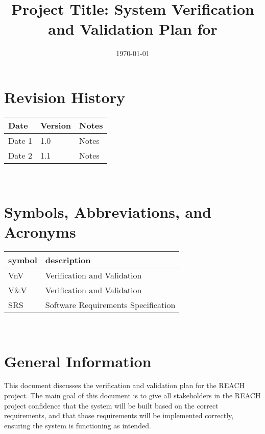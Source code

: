 \documentclass[12pt, titlepage]{article}
\begin{document}
\title{Project Title: System Verification and Validation Plan for \progname{}} 
\author{\authname}
\date{\today}
	
\maketitle


\section*{Revision History}

\begin{tabularx}{\textwidth}{p{3cm}p{2cm}X}
\toprule {\bf Date} & {\bf Version} & {\bf Notes}\\
\midrule
Date 1 & 1.0 & Notes\\
Date 2 & 1.1 & Notes\\
\bottomrule
\end{tabularx}

~\\

\newpage

\tableofcontents

\listoftables

\newpage

\section{Symbols, Abbreviations, and Acronyms}

\renewcommand{\arraystretch}{1.2}
\begin{tabular}{l l} 
  \toprule		
  \textbf{symbol} & \textbf{description}\\
  \midrule 
  VnV & Verification and Validation\\
  V\&V & Verification and Validation\\
  SRS & Software Requirements Specification\\
  \bottomrule
\end{tabular}\\

\newpage


\section{General Information}

This document discusses the verification and validation plan for the REACH project. The main goal of this document
is to give all stakeholders in the REACH project confidence that the system will be built based on the correct 
requirements, and that those requirements will be implemented correctly, ensuring the system is functioning as intended.
\end{document}
